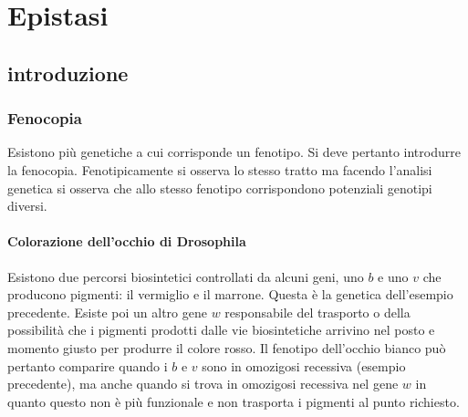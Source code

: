 \chapter{Epistasi}
\section{introduzione}
\subsection{Fenocopia}
Esistono pi\`u genetiche a cui corrisponde un fenotipo. Si deve pertanto introdurre la fenocopia. Fenotipicamente si osserva lo stesso tratto ma facendo l'analisi genetica si osserva
che allo stesso fenotipo corrispondono potenziali genotipi diversi. 
\subsubsection{Colorazione dell'occhio di Drosophila}
Esistono due percorsi biosintetici controllati da alcuni geni, uno $b$ e uno $v$ che producono pigmenti: il vermiglio e il marrone. Questa \`e la genetica dell'esempio precedente. 
Esiste poi un altro gene $w$ responsabile del trasporto o della possibilit\`a che i pigmenti prodotti dalle vie biosintetiche arrivino nel posto e momento giusto per produrre il 
colore rosso. Il fenotipo dell'occhio bianco pu\`o pertanto comparire quando i $b$ e $v$ sono in omozigosi recessiva (esempio precedente), ma anche quando si trova in omozigosi
recessiva nel gene $w$ in quanto questo non \`e pi\`u funzionale e non trasporta i pigmenti al punto richiesto. 
